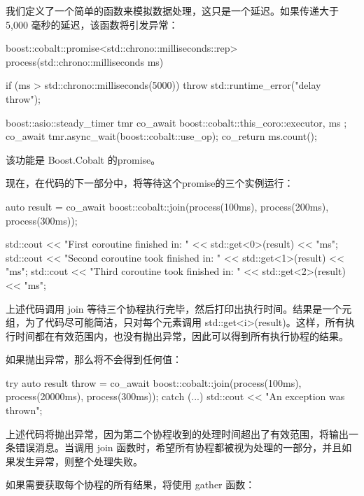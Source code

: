 我们定义了一个简单的函数来模拟数据处理，这只是一个延迟。如果传递大于 5,000 毫秒的延迟，该函数将引发异常：

\begin{cpp}
boost::cobalt::promise<std::chrono::milliseconds::rep>
process(std::chrono::milliseconds ms) {
    if (ms > std::chrono::milliseconds(5000)) {
        throw std::runtime_error("delay throw");
    }

    boost::asio::steady_timer tmr{ co_await boost::cobalt::this_coro::executor, ms };
    co_await tmr.async_wait(boost::cobalt::use_op);
    co_return ms.count();
}
\end{cpp}

该功能是 Boost.Cobalt 的promise。

现在，在代码的下一部分中，将等待这个promise的三个实例运行：

\begin{cpp}
auto result = co_await boost::cobalt::join(process(100ms),
                                           process(200ms),
                                           process(300ms));

std::cout << "First coroutine finished in: "
          << std::get<0>(result) << "ms\n";
std::cout << "Second coroutine took finished in: "
          << std::get<1>(result) << "ms\n";
std::cout << "Third coroutine took finished in: "
          << std::get<2>(result) << "ms\n";
\end{cpp}

上述代码调用 join 等待三个协程执行完毕，然后打印出执行时间。结果是一个元组，为了代码尽可能简洁，只对每个元素调用 std::get<i>(result)。这样，所有执行时间都在有效范围内，也没有抛出异常，因此可以得到所有执行协程的结果。

如果抛出异常，那么将不会得到任何值：

\begin{cpp}
try {
    auto result throw = co_await
    boost::cobalt::join(process(100ms),
                        process(20000ms),
                        process(300ms));
}
catch (...) {
    std::cout << "An exception was thrown\n";
}
\end{cpp}

上述代码将抛出异常，因为第二个协程收到的处理时间超出了有效范围，将输出一条错误消息。当调用 join 函数时，希望所有协程都被视为处理的一部分，并且如果发生异常，则整个处理失败。

如果需要获取每个协程的所有结果，将使用 gather 函数：

